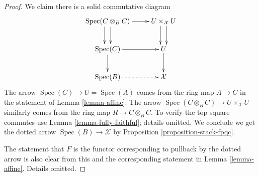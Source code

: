 \documentclass[10pt,a4paper]{amsart}
\theoremstyle{plain}
\theoremstyle{definition}
\theoremstyle{remark}
\numberwithin{equation}{subsection}
\def\Spec{\mathop{\mathrm{Spec}}}
\begin{document}
\begin{proof}
\medskip\noindent
We claim there is a solid commutative diagram
$$
\xymatrix{
\Spec(C \otimes_B C) \ar@<1ex>[d] \ar@<-1ex>[d] \ar[r] &
U \times_\mathcal{X} U \ar@<1ex>[d] \ar@<-1ex>[d] \\
\Spec(C) \ar[d] \ar[r] &
U \ar[d] \\
\Spec(B) \ar@{..>}[r] &
\mathcal{X}
}
$$
The arrow $\Spec(C) \to U = \Spec(A)$ comes from the ring map
$A \to C$ in the statement of Lemma \ref{lemma-affine}.
The arrow $\Spec(C \otimes_B C) \to U \times_\mathcal{X} U$
similarly comes from the ring map $R \to C \otimes_B C$.
To verify the top square commutes use Lemma \ref{lemma-fully-faithful};
details omitted.
We conclude we get the dotted arrow $\Spec(B) \to \mathcal{X}$
by Proposition \ref{proposition-stack-fpqc}.

\medskip\noindent
The statement that $F$ is the functor corresponding to pullback
by the dotted arrow is also clear from this and the corresponding
statement in Lemma \ref{lemma-affine}. Details omitted.
\end{proof}
\end{document}
